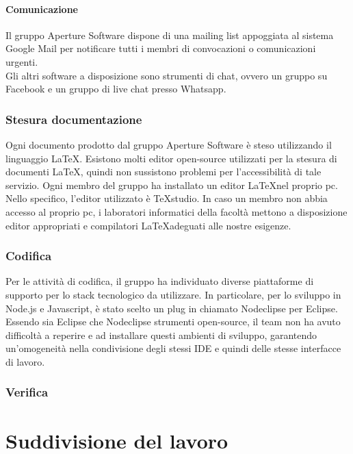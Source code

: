 \paragraph{Comunicazione}
Il gruppo Aperture Software dispone di una mailing list appoggiata al sistema Google Mail per notificare tutti i membri di convocazioni o comunicazioni urgenti.\\
Gli altri software a disposizione sono strumenti di chat, ovvero un gruppo su Facebook e un gruppo di live chat presso Whatsapp. 

\subsubsection{Stesura documentazione}
Ogni documento prodotto dal gruppo Aperture Software è steso utilizzando il linguaggio \LaTeX. Esistono molti editor open-source utilizzati per la stesura di documenti \LaTeX, quindi non sussistono problemi per l'accessibilità di tale servizio. Ogni membro del gruppo ha installato un editor \LaTeX nel proprio pc. Nello specifico, l'editor utilizzato è TeXstudio. In caso un membro non abbia accesso al proprio pc, i laboratori informatici della facoltà mettono a disposizione editor appropriati e compilatori \LaTeX adeguati alle nostre esigenze.

\subsubsection{Codifica}
Per le attività di codifica, il gruppo ha individuato diverse piattaforme di supporto per lo stack tecnologico da utilizzare. In particolare, per lo sviluppo in Node.js e Javascript, è stato scelto un plug in chiamato Nodeclipse per Eclipse.\\
Essendo sia Eclipse che Nodeclipse strumenti open-source, il team non ha avuto difficoltà a reperire e ad installare questi ambienti di sviluppo, garantendo un'omogeneità nella condivisione degli stessi IDE e quindi delle stesse interfacce di lavoro.

\subsubsection{Verifica}



\newpage


\section{Suddivisione del lavoro}


